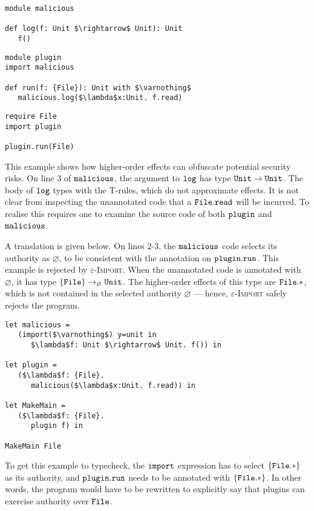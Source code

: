 \begin{lstlisting}
module malicious

def log(f: Unit $\rightarrow$ Unit): Unit
   f()
\end{lstlisting}

\begin{lstlisting}
module plugin
import malicious

def run(f: {File}): Unit with $\varnothing$
   malicious.log($\lambda$x:Unit. f.read)
\end{lstlisting}

\begin{lstlisting}
require File
import plugin

plugin.run(File)
\end{lstlisting}

This example shows how higher-order effects can obfuscate potential security risks. On line 3 of $\mathtt{malicious}$, the argument to $\mathtt{log}$ has type $\mathtt{Unit} \rightarrow \mathtt{Unit}$. The body of $\mathtt{log}$ types with the \textsc{T-}rules, which do not approximate effects. It is not clear from inspecting the unannotated code that a $\mathtt{File.read}$ will be incurred. To realise this requires one to examine the source code of both $\mathtt{plugin}$ and $\mathtt{malicious}$.

A translation is given below. On lines 2-3, the $\mathtt{malicious}$ code selects its authority as $\varnothing$, to be consistent with the annotation on $\mathtt{plugin.run}$. This example is rejected by \textsc{$\varepsilon$-Import}. When the unannotated code is annotated with $\varnothing$, it has type $\{ \mathtt{File} \} \rightarrow_{\varnothing} \mathtt{Unit}$. The higher-order effects of this type are $\mathtt{File.*}$, which is not contained in the selected authority $\varnothing$ --- hence, \textsc{$\varepsilon$-Import} safely rejects the program.

\begin{lstlisting}
let malicious =
   (import($\varnothing$) y=unit in
      $\lambda$f: Unit $\rightarrow$ Unit. f()) in

let plugin =
   ($\lambda$f: {File}.
      malicious($\lambda$x:Unit. f.read)) in

let MakeMain =
   ($\lambda$f: {File}.
      plugin f) in

MakeMain File
\end{lstlisting}

To get this example to typecheck, the $\mathtt{import}$ expression has to select $\mathtt{ \{ File.* \}}$ as its authority, and $\mathtt{plugin.run}$ needs to be annotated with $\mathtt{ \{ File.* \}}$. In other words, the program would have to be rewritten to explicitly say that plugins can exercise authority over $\mathtt{File}$.


